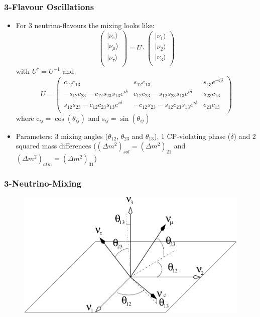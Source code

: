 \documentclass{beamer}
\begin{document}
\begin{frame}
  \frametitle{3-Flavour Oscillations}
	\begin{itemize}

	\item For 3 neutrino-flavours the mixing looks like:
$$
\left(\begin{array}{c}
| \nu_{e} \rangle \\
| \nu_{\mu} \rangle \\
| \nu_{\tau} \rangle \\
\end{array}\right)=
U\cdot
\left(\begin{array}{c}
| \nu_{1} \rangle \\
| \nu_{2} \rangle \\
| \nu_{3} \rangle \\
\end{array}\right)
$$
with $U^{\dagger}=U^{-1}$ and
$$
U=
\left(\begin{array}{ccc}
c_{12}c_{13} & s_{12}c_{13}&s_{13}e^{-i\delta}\\
-s_{12}c_{23}-c_{12}s_{23}s_{13}e^{i\delta} & c_{12}c_{23}-s_{12}s_{23}s_{13}e^{i\delta} & s_{23}c_{13}\\
s_{12}s_{23}-c_{12}c_{23}s_{13}e^{i\delta} & -c_{12}s_{23}-s_{12}c_{23}s_{13}e^{i\delta} & c_{23}c_{13}\\
\end{array}\right)
$$
where c$_{ij}=\cos(\theta_{ij})$ and s$_{ij}=\sin(\theta_{ij})$

\item Parameters: 3 mixing angles ($\theta_{12}$, $\theta_{23}$ and $\theta_{13}$), 1 CP-violating phase ($\delta$) and 2 squared mass differences ($(\Delta m^2)_{sol}=(\Delta m^2)_{21}$ and $(\Delta m^2)_{atm}=(\Delta m^2)_{31}$)

	\end{itemize}  
\end{frame}



\begin{frame}
	\frametitle{3-Neutrino-Mixing}

\begin{figure}
    \begin{center}
      \includegraphics[width=12cm]{fig/angles.pdf}
    \end{center}
 \end{figure}


\end{frame}
\end{document}
